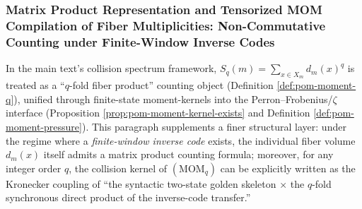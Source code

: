 \subsubsection{Matrix Product Representation and Tensorized MOM Compilation of Fiber Multiplicities: Non-Commutative Counting under Finite-Window Inverse Codes}\label{subsubsec:pom-multiplicity-matrix-product-tensor-mom}
In the main text's collision spectrum framework, \(S_q(m)=\sum_{x\in X_m}d_m(x)^q\) is treated as a ``\(q\)-fold fiber product'' counting object (Definition \ref{def:pom-moment-q}), unified through finite-state moment-kernels into the Perron--Frobenius/\(\zeta\) interface (Proposition \ref{prop:pom-moment-kernel-exists} and Definition \ref{def:pom-moment-pressure}).
This paragraph supplements a finer structural layer: under the regime where a \emph{finite-window inverse code} exists, the individual fiber volume \(d_m(x)\) itself admits a matrix product counting formula; moreover, for any integer order \(q\), the collision kernel of \((\mathrm{MOM}_q)\) can be explicitly written as the Kronecker coupling of ``the syntactic two-state golden skeleton \(\times\) the \(q\)-fold synchronous direct product of the inverse-code transfer.''


